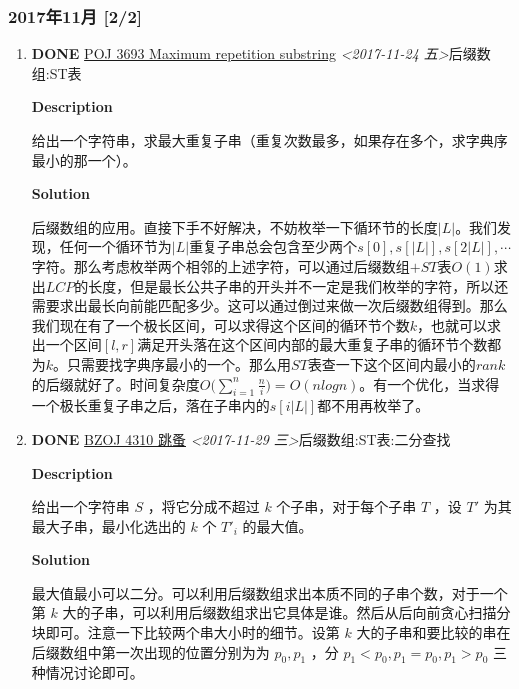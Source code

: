 \documentclass[11pt]{article}
\begin{document}
\subsubsection{2017年11月 [2/2]}
\label{sec:orga87abf4}
\begin{enumerate}
\item {\bfseries\sffamily DONE} \href{https://vjudge.net/problem/POJ-3693}{POJ 3693 Maximum repetition substring} \textit{<2017-11-24 五>}\hfill{}\textsc{后缀数组:ST表}
\label{sec:org84d4142}

\textbf{Description}

给出一个字符串，求最大重复子串（重复次数最多，如果存在多个，求字典序最小的那一个）。

\textbf{Solution}

后缀数组的应用。直接下手不好解决，不妨枚举一下循环节的长度\(|L|\)。我们发现，任何一个循环节为\(|L|\)重复子串总会包含至少两个\(s[0],s[|L|],s[2|L|], \cdots\)字符。那么考虑枚举两个相邻的上述字符，可以通过后缀数组\(+ST\)表\(O(1)\)求出\(LCP\)的长度，但是最长公共子串的开头并不一定是我们枚举的字符，所以还需要求出最长向前能匹配多少。这可以通过倒过来做一次后缀数组得到。那么我们现在有了一个极长区间，可以求得这个区间的循环节个数\(k\)，也就可以求出一个区间\([l,r]\)满足开头落在这个区间内部的最大重复子串的循环节个数都为\(k\)。只需要找字典序最小的一个。那么用\(ST\)表查一下这个区间内最小的\(rank\)的后缀就好了。时间复杂度\(O\Big(\sum_{i=1}^{n}\frac{n}{i}\Big)=O(nlogn)\)。有一个优化，当求得一个极长重复子串之后，落在子串内的\(s[i|L|]\)都不用再枚举了。

\item {\bfseries\sffamily DONE} \href{http://www.lydsy.com/JudgeOnline/problem.php?id=4310}{BZOJ 4310 跳蚤} \textit{<2017-11-29 三>}\hfill{}\textsc{后缀数组:ST表:二分查找}
\label{sec:org1d68e8d}

\textbf{Description}

给出一个字符串 \(S\) ，将它分成不超过 \(k\) 个子串，对于每个子串 \(T\) ，设 \(T'\) 为其最大子串，最小化选出的 \(k\) 个 \(T'_i\) 的最大值。

\textbf{Solution}

最大值最小可以二分。可以利用后缀数组求出本质不同的子串个数，对于一个第 \(k\) 大的子串，可以利用后缀数组求出它具体是谁。然后从后向前贪心扫描分块即可。注意一下比较两个串大小时的细节。设第 \(k\) 大的子串和要比较的串在后缀数组中第一次出现的位置分别为为 \(p_0,p_1\) ，分 \(p_1 < p_0,p_1=p_0,p_1 > p_0\) 三种情况讨论即可。
\end{enumerate}
\end{document}
